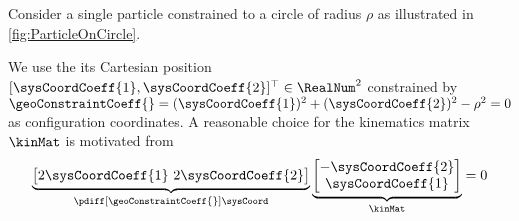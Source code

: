 

\begin{Example}
Consider a single particle constrained to a circle of radius $\rho$ as illustrated in \autoref{fig:ParticleOnCircle}.

\begin{minipage}{\textwidth}
 \centering
 
 \label{fig:ParticleOnCircle}
\end{minipage}

We use the its Cartesian position $[\sysCoordCoeff{1}, \sysCoordCoeff{2}]^\top \in \RealNum^2$ constrained by $\geoConstraintCoeff{} = (\sysCoordCoeff{1})^2 + (\sysCoordCoeff{2})^2 - \rho^2 = 0$ as configuration coordinates.
A reasonable choice for the kinematics matrix $\kinMat$ is motivated from
\begin{align}
 \underbrace{\big[ 2\sysCoordCoeff{1} \ 2\sysCoordCoeff{2} \big]}_{\pdiff[\geoConstraintCoeff{}]{\sysCoord}}
 \underbrace{\begin{bmatrix} -\sysCoordCoeff{2} \\ \sysCoordCoeff{1} \end{bmatrix}}_{\kinMat}
 = 0
\end{align}


\end{Example}

